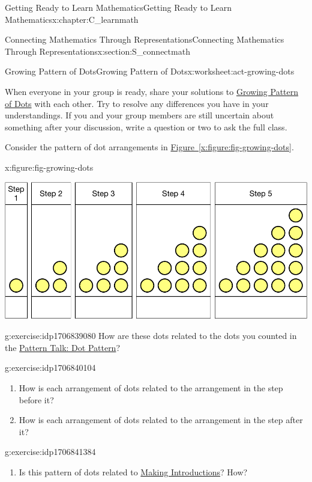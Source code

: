 \documentclass[oneside,10pt,]{book}
\newcommand{\xreffont}{\relax}
\numberwithin{equation}{chapter}
\begin{document}
\begin{chapterptx}{Getting Ready to Learn Mathematics}{}{Getting Ready to Learn Mathematics}{}{}{x:chapter:C_learnmath}
\begin{sectionptx}{Connecting Mathematics Through Representations}{}{Connecting Mathematics Through Representations}{}{}{x:section:S_connectmath}
\begin{worksheet-subsection}{Growing Pattern of Dots}{}{Growing Pattern of Dots}{}{}{x:worksheet:act-growing-dots}
\begin{introduction}{}
When everyone in your group is ready, share your solutions to \hyperref[x:worksheet:act-growing-dots]{Growing Pattern of Dots} with each other. Try to resolve any differences you have in your understandings. If you and your group members are still uncertain about something after your discussion, write a question or two to ask the full class.%
\par
Consider the pattern of dot arrangements in \hyperref[x:figure:fig-growing-dots]{Figure~{\xreffont\ref{x:figure:fig-growing-dots}}}.%
\begin{figureptx}{}{x:figure:fig-growing-dots}{}%
\begin{image}{0}{1}{0}%
\includegraphics[width=\linewidth]{external/growing-dots.pdf}
\end{image}%
\tcblower
\end{figureptx}%
\end{introduction}%
\begin{divisionexercise}{1}{}{}{g:exercise:idp1706839080}%
How are these dots related to the dots you counted in the \hyperref[x:subsection:SS_dot_pattern]{Pattern Talk: Dot Pattern}?%
\end{divisionexercise}%
\begin{divisionexercise}{2}{}{}{g:exercise:idp1706840104}%
\begin{enumerate}[font=\bfseries,label=(\alph*),ref=\alph*]
\item{}How is each arrangement of dots related to the arrangement in the step before it?%
\item{}How is each arrangement of dots related to the arrangement in the step after it?%
\end{enumerate}
\end{divisionexercise}%
\begin{divisionexercise}{3}{}{}{g:exercise:idp1706841384}%
\begin{enumerate}[font=\bfseries,label=(\alph*),ref=\alph*]
\item{}Is this pattern of dots related to \hyperref[x:activity:act-introductions]{Making Introductions}? How?%

\end{enumerate}
\end{divisionexercise}
\end{worksheet-subsection}
\end{sectionptx}
\end{chapterptx}
\end{document}
